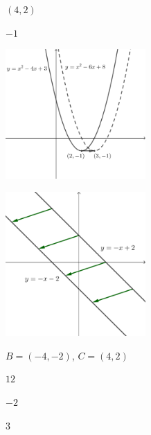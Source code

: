\documentclass{oblivoir}
\begin{document}
\begin{multicols*}{2}
%
\((4,2)\)

%
\(-1\)

%
\begin{center}
\bigskip\includegraphics[width=0.4\textwidth]{ttranslate_5}
\end{center}

%
\begin{center}
\bigskip\includegraphics[width=0.4\textwidth]{ttranslate_6}
\end{center}

%
\(B=(-4,-2)\), \(C=(4,2)\)

%
\(12\)

%
\(-2\)

%
\(3\)


\end{multicols*}
\end{document}
